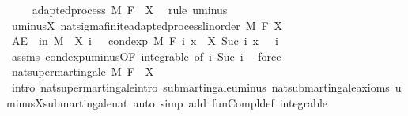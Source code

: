 \begin{isabellebody}
\ \ \isamarkupfalse%
\ {\isacharunderscore}{\kern0pt}{\isacharcolon}{\kern0pt}\ adapted{\isacharunderscore}{\kern0pt}process\ M\ F\ {}\ {\isachardoublequoteopen}{\isacharminus}{\kern0pt}X{\isachardoublequoteclose}\ \isamarkupfalse%
\ {\isacharparenleft}{\kern0pt}rule\ uminus{\isacharparenright}{\kern0pt}\isanewline
\ \ \isamarkupfalse%
\ uminus{\isacharunderscore}{\kern0pt}X{\isacharcolon}{\kern0pt}\ nat{\isacharunderscore}{\kern0pt}sigma{\isacharunderscore}{\kern0pt}finite{\isacharunderscore}{\kern0pt}adapted{\isacharunderscore}{\kern0pt}process{\isacharunderscore}{\kern0pt}linorder\ M\ F\ {\isachardoublequoteopen}{\isacharminus}{\kern0pt}X{\isachardoublequoteclose}\ \isacommand{{\isachardot}{\kern0pt}{\isachardot}{\kern0pt}}\isamarkupfalse%
\isanewline
\ \ \isamarkupfalse%
\ {\isachardoublequoteopen}AE\ {\isasymxi}\ in\ M{\isachardot}{\kern0pt}\ {\isacharminus}{\kern0pt}\ X\ i\ {\isasymxi}\ {\isasymle}\ cond{\isacharunderscore}{\kern0pt}exp\ M\ {\isacharparenleft}{\kern0pt}F\ i{\isacharparenright}{\kern0pt}\ {\isacharparenleft}{\kern0pt}{\isasymlambda}x{\isachardot}{\kern0pt}\ {\isacharminus}{\kern0pt}\ X\ {\isacharparenleft}{\kern0pt}Suc\ i{\isacharparenright}{\kern0pt}\ x{\isacharparenright}{\kern0pt}\ {\isasymxi}{\isachardoublequoteclose}\ \ i\ \isamarkupfalse%
\ assms{\isacharparenleft}{\kern0pt}{}{\isacharparenright}{\kern0pt}\ cond{\isacharunderscore}{\kern0pt}exp{\isacharunderscore}{\kern0pt}uminus{\isacharbrackleft}{\kern0pt}OF\ integrable{\isacharcomma}{\kern0pt}\ of\ i\ {\isachardoublequoteopen}Suc\ i{\isachardoublequoteclose}{\isacharbrackright}{\kern0pt}\ \isamarkupfalse%
\ force\isanewline
\ \ \isamarkupfalse%
\ {\isachardoublequoteopen}nat{\isacharunderscore}{\kern0pt}supermartingale\ M\ F\ {\isacharparenleft}{\kern0pt}{\isacharminus}{\kern0pt}{\isacharparenleft}{\kern0pt}{\isacharminus}{\kern0pt}\ X{\isacharparenright}{\kern0pt}{\isacharparenright}{\kern0pt}{\isachardoublequoteclose}\ \isamarkupfalse%
\ {\isacharparenleft}{\kern0pt}intro\ nat{\isacharunderscore}{\kern0pt}supermartingale{\isachardot}{\kern0pt}intro\ submartingale{\isachardot}{\kern0pt}uminus\ nat{\isacharunderscore}{\kern0pt}submartingale{\isachardot}{\kern0pt}axioms\ uminus{\isacharunderscore}{\kern0pt}X{\isachardot}{\kern0pt}submartingale{\isacharunderscore}{\kern0pt}nat{\isacharparenright}{\kern0pt}\ {\isacharparenleft}{\kern0pt}auto\ simp\ add{\isacharcolon}{\kern0pt}\ fun{\isacharunderscore}{\kern0pt}Compl{\isacharunderscore}{\kern0pt}def\ integrable{\isacharparenright}{\kern0pt}\isanewline

\end{isabellebody}
